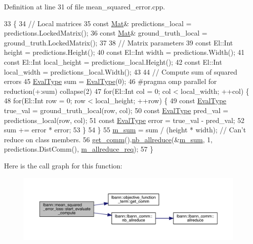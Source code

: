 Definition at line 31 of file mean\+\_\+squared\+\_\+error.\+cpp.


\begin{DoxyCode}
33                                   \{
34   \textcolor{comment}{// Local matrices}
35   \textcolor{keyword}{const} \hyperlink{base_8hpp_a68f11fdc31b62516cb310831bbe54d73}{Mat}& predictions\_local = predictions.LockedMatrix();
36   \textcolor{keyword}{const} \hyperlink{base_8hpp_a68f11fdc31b62516cb310831bbe54d73}{Mat}& ground\_truth\_local = ground\_truth.LockedMatrix();
37 
38   \textcolor{comment}{// Matrix parameters}
39   \textcolor{keyword}{const} El::Int height = predictions.Height();
40   \textcolor{keyword}{const} El::Int width = predictions.Width();
41   \textcolor{keyword}{const} El::Int local\_height = predictions\_local.Height();
42   \textcolor{keyword}{const} El::Int local\_width = predictions\_local.Width();
43 
44   \textcolor{comment}{// Compute sum of squared errors}
45   \hyperlink{base_8hpp_a3266f5ac18504bbadea983c109566867}{EvalType} sum = \hyperlink{base_8hpp_a3266f5ac18504bbadea983c109566867}{EvalType}(0);
46 \textcolor{preprocessor}{  #pragma omp parallel for reduction(+:sum) collapse(2)}
47   \textcolor{keywordflow}{for}(El::Int col = 0; col < local\_width; ++col) \{
48     \textcolor{keywordflow}{for}(El::Int row = 0; row < local\_height; ++row) \{
49       \textcolor{keyword}{const} \hyperlink{base_8hpp_a3266f5ac18504bbadea983c109566867}{EvalType} true\_val = ground\_truth\_local(row, col);
50       \textcolor{keyword}{const} \hyperlink{base_8hpp_a3266f5ac18504bbadea983c109566867}{EvalType} pred\_val = predictions\_local(row, col);
51       \textcolor{keyword}{const} \hyperlink{base_8hpp_a3266f5ac18504bbadea983c109566867}{EvalType} error = true\_val - pred\_val;
52       sum += error * error;
53     \}
54   \}
55   \hyperlink{classlbann_1_1mean__squared__error__loss_aae743bb204b7f047967ccd867c00721a}{m\_sum} = sum / (height * width);  \textcolor{comment}{// Can't reduce on class members.}
56   \hyperlink{classlbann_1_1objective__function__term_a5f89b676a26a6b76ddc26563ac87beb9}{get\_comm}().\hyperlink{classlbann_1_1lbann__comm_a2a7bb6cf3707366fc0671d8894ca30ea}{nb\_allreduce}(&\hyperlink{classlbann_1_1mean__squared__error__loss_aae743bb204b7f047967ccd867c00721a}{m\_sum}, 1, predictions.DistComm(), 
      \hyperlink{classlbann_1_1mean__squared__error__loss_a24fde367aadff7101900bb845dce775e}{m\_allreduce\_req});
57 \}
\end{DoxyCode}
Here is the call graph for this function\+:\nopagebreak
\begin{figure}[H]
\begin{center}
\leavevmode
\includegraphics[width=350pt]{classlbann_1_1mean__squared__error__loss_a5cfc9b54a4161015f63e5445e34f49f4_cgraph}
\end{center}
\end{figure}
